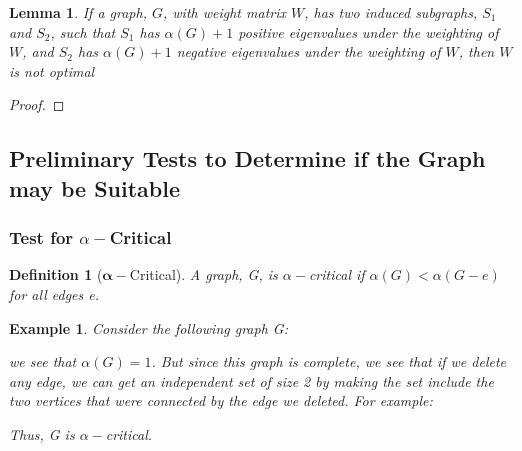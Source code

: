 \documentclass[12pt]{article}
\theoremstyle{parenbold}
\newtheorem{definition}{Definition}[section]
\newtheorem{exmp}{Example}[section]
\newtheorem{lemma}{Lemma}[section]
\begin{document}
\begin{lemma}
If a graph, $G$, with weight matrix $W$, has two induced subgraphs, $S_1$ and $S_2$, such that $S_1$ has $\alpha(G)+1$ positive eigenvalues under the weighting of $W$, and $S_2$ has $\alpha(G)+1$ negative eigenvalues under the weighting of $W$, then $W$ is not optimal
\end{lemma}

\begin{proof}



\end{proof}

\subsection{Preliminary Tests to Determine if the Graph may be Suitable}

\subsubsection{Test for $\alpha-$Critical}

\begin{definition}[$\bm{\alpha-}$Critical]
A graph, G, is $\alpha-$critical if $\alpha(G) < \alpha(G-e)$ for all edges e.
\end{definition}

\begin{exmp}
Consider the following graph G:


we see that $\alpha(G) = 1$. But since this graph is complete, we see that if we delete any edge, we can get an independent set of size 2 by making the set include the two vertices that were connected by the edge we deleted. For example:


Thus, G is $\alpha-$critical.
\end{exmp}
\end{document}
